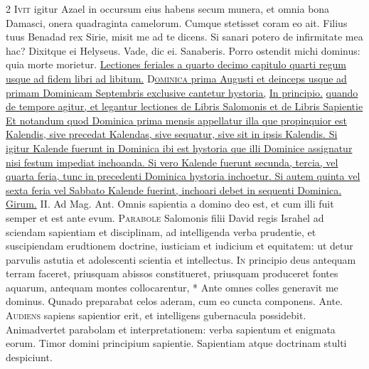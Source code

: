 \begin{multicols*}{2}
\lettrine[lines=2]{\zallmancaps \color{Red} I}{vit} igitur Azael in occursum eius habens secum munera, et omnia bona Damasci, onera quadraginta camelorum. Cumque stetisset coram eo ait. Filius tuus Benadad rex Sirie, misit me ad te dicens. Si sanari potero de infirmitate mea hac? Dixitque ei Helyseus. Vade, dic ei. Sanaberis. Porro ostendit michi dominus: quia morte morietur.
\newline \ul{Lectiones feriales a quarto decimo capitulo quarti regum usque ad fidem libri ad libitum.}
\lettrine[lines=2]{\zallmancaps \color{Blue} D}{}\ul{\textsc{ominica} prima Augusti et deinceps usque ad primam Dominicam Septembris exclusive cantetur hystoria,} \hyperlink{in-principio}{In principio.} \ul{quando de tempore agitur, et legantur lectiones de Libris Salomonis et de Libris Sapientie Et notandum quod Dominica prima mensis appellatur illa que propinquior est Kalendis, sive precedat Kalendas, sive sequatur, sive sit in ipsis Kalendis. Si igitur Kalende fuerunt in Dominica ibi est hystoria que illi Dominice assignatur nisi festum impediat inchoanda. Si vero Kalende fuerunt secunda, tercia, vel quarta feria, tunc in precedenti Dominica hystoria inchoetur. Si autem quinta vel sexta feria vel Sabbato Kalende fuerint, inchoari debet in sequenti Dominica.}
{\color{Red} }
 \R \hyperlink{girum-celi}{Girum.} {\color{Red} II. Ad Mag. Ant.} Omnis sapientia a domino deo est, et cum illi fuit semper et est ante evum.
\lettrine[lines=2]{\zallmancaps \color{Red} P}{arabole} Salomonis filii David regis Israhel ad sciendam sapientiam et disciplinam, ad intelligenda verba prudentie, et suscipiendam erudtionem doctrine, iusticiam et iudicium et equitatem: ut detur parvulis astutia et adolescenti scientia et intellectus. \R
\lettrine[lines=2]{\zallmancaps \color{Blue} I}{n} \hypertarget{in-principio}{\label{in-principio}} principio deus antequam terram faceret, priusquam abissos constitueret, priusquam produceret fontes aquarum, antequam montes collocarentur, * Ante omnes colles generavit me dominus. \V Qunado preparabat celos aderam, cum eo cuncta componens. Ante.
\lettrine[lines=2]{\zallmancaps \color{Red} A}{udiens} sapiens sapientior erit, et intelligens gubernacula possidebit. Animadvertet parabolam et interpretationem: verba sapientum et enigmata eorum. Timor domini principium sapientie. Sapientiam atque doctrinam stulti despiciunt.

\end{multicols*}
